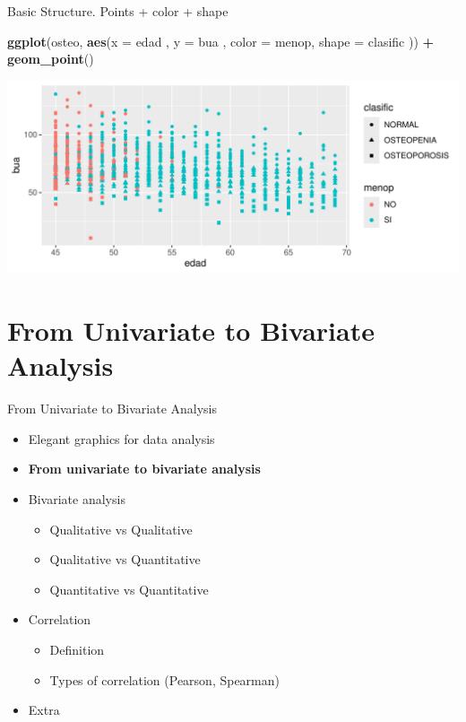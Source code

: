 \documentclass[
  ignorenonframetext,
]{beamer}
\newenvironment{Shaded}{\begin{snugshade}}{\end{snugshade}}
\newcommand{\AttributeTok}[1]{\textcolor[rgb]{0.13,0.29,0.53}{#1}}
\newcommand{\FunctionTok}[1]{\textcolor[rgb]{0.13,0.29,0.53}{\textbf{#1}}}
\newcommand{\NormalTok}[1]{#1}
\newcommand{\SpecialCharTok}[1]{\textcolor[rgb]{0.81,0.36,0.00}{\textbf{#1}}}
\begin{document}
\begin{frame}[fragile]{Basic Structure. Points + color + shape}
\label{basic-structure.-points-color-shape}
\begin{Shaded}
\begin{Highlighting}[]
\FunctionTok{ggplot}\NormalTok{(osteo, }\FunctionTok{aes}\NormalTok{(}\AttributeTok{x =}\NormalTok{ edad , }\AttributeTok{y =}\NormalTok{ bua   , }\AttributeTok{color =}\NormalTok{ menop, }\AttributeTok{shape =}\NormalTok{ clasific )) }\SpecialCharTok{+} 
  \FunctionTok{geom\_point}\NormalTok{()}
\end{Highlighting}
\end{Shaded}

\includegraphics{StatisticsWithR-3-Exploratory_Analysis_II_And_Graphics_files/figure-beamer/unnamed-chunk-6-1.pdf}
\end{frame}

\section{From Univariate to Bivariate
Analysis}\label{from-univariate-to-bivariate-analysis}

\begin{frame}{From Univariate to Bivariate Analysis}
\begin{itemize}
\item
  Elegant graphics for data analysis
\item
  \textbf{From univariate to bivariate analysis}
\item
  Bivariate analysis

  \begin{itemize}
  \item
    Qualitative vs Qualitative
  \item
    Qualitative vs Quantitative
  \item
    Quantitative vs Quantitative
  \end{itemize}
\item
  Correlation

  \begin{itemize}
  \item
    Definition
  \item
    Types of correlation (Pearson, Spearman)
  \end{itemize}
\item
  Extra
\end{itemize}
\end{frame}
\end{document}
